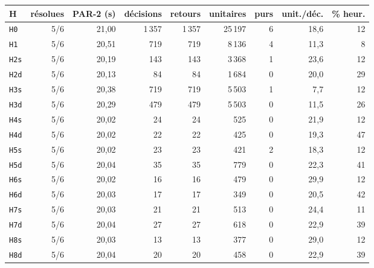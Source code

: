 \begin{tabular}{lrrrrrrrr}
\toprule
H & résolues & PAR-2 (s) & décisions & retours & unitaires & purs & unit./déc. & \% heur. \\
\midrule
\texttt{H0} & 5/6 & 21{,}00 & 1\,357 & 1\,357 & 25\,197 & 6 & 18{,}6 & 12 \\
\texttt{H1} & 5/6 & 20{,}51 & 719 & 719 & 8\,136 & 4 & 11{,}3 & 8 \\
\texttt{H2s} & 5/6 & 20{,}19 & 143 & 143 & 3\,368 & 1 & 23{,}6 & 12 \\
\texttt{H2d} & 5/6 & 20{,}13 & 84 & 84 & 1\,684 & 0 & 20{,}0 & 29 \\
\texttt{H3s} & 5/6 & 20{,}38 & 719 & 719 & 5\,503 & 1 & 7{,}7 & 12 \\
\texttt{H3d} & 5/6 & 20{,}29 & 479 & 479 & 5\,503 & 0 & 11{,}5 & 26 \\
\texttt{H4s} & 5/6 & 20{,}02 & 24 & 24 & 525 & 0 & 21{,}9 & 12 \\
\texttt{H4d} & 5/6 & 20{,}02 & 22 & 22 & 425 & 0 & 19{,}3 & 47 \\
\texttt{H5s} & 5/6 & 20{,}02 & 23 & 23 & 421 & 2 & 18{,}3 & 12 \\
\texttt{H5d} & 5/6 & 20{,}04 & 35 & 35 & 779 & 0 & 22{,}3 & 41 \\
\texttt{H6s} & 5/6 & 20{,}02 & 16 & 16 & 479 & 0 & 29{,}9 & 12 \\
\texttt{H6d} & 5/6 & 20{,}03 & 17 & 17 & 349 & 0 & 20{,}5 & 42 \\
\texttt{H7s} & 5/6 & 20{,}03 & 21 & 21 & 513 & 0 & 24{,}4 & 11 \\
\texttt{H7d} & 5/6 & 20{,}04 & 27 & 27 & 618 & 0 & 22{,}9 & 39 \\
\texttt{H8s} & 5/6 & 20{,}03 & 13 & 13 & 377 & 0 & 29{,}0 & 12 \\
\texttt{H8d} & 5/6 & 20{,}04 & 20 & 20 & 458 & 0 & 22{,}9 & 39 \\
\bottomrule
\end{tabular}
